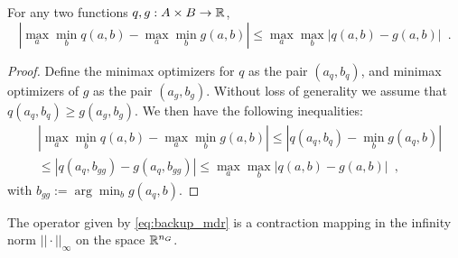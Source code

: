 %
\begin{lemma}\label{lem:maxmin} For any two functions $q, g: A \times B \rightarrow \mathbb{R}$,
\begin{equation}
|\max_a \min_b q(a,b) -\max_a \min_b g(a,b)| \leq \max_a \max_b |q(a,b) - g(a,b)|
\enspace.
\end{equation}
\end{lemma}
%
\begin{proof}
Define the minimax optimizers for $q$ as the pair $(a_q,b_q)$, and minimax optimizers of $g$ as the pair $(a_g, b_g)$. Without loss of generality we assume that ${q(a_q,b_q) \geq g(a_g,b_g)}$.
We then have the following inequalities:
%
\begin{equation*}
\begin{split}
&|\max_a \min_b q(a,b) -\max_a \min_b g(a,b)|
\leq |q(a_q,b_q) - \min_b g(a_q,b)|\\
&\leq |q(a_q,b_{gg}) - g(a_q,b_{gg})| \leq \max_a \max_b |q(a,b) - g(a,b)|
\enspace,
\end{split}
\end{equation*}
with $b_{gg} :=\displaystyle{\arg\min_b g(a_q,b)}$.
%
\end{proof}
%
\begin{theorem} 
The operator given by \eqref{eq:backup_mdr} is a contraction mapping in the infinity norm $|| \cdot ||_{\infty}$ on the space $\mathbb{R}^{n_G}$.
\end{theorem}
